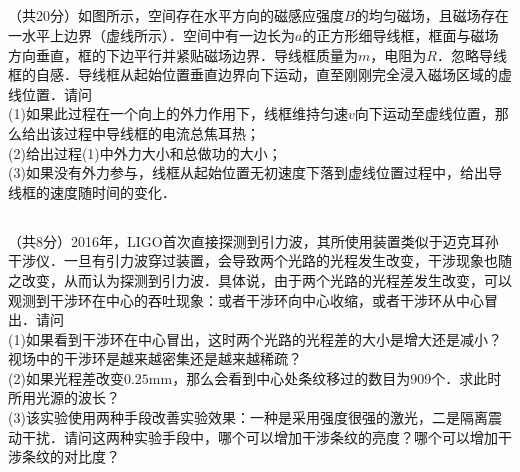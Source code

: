 \subsection{ }
（共20分）如图所示，空间存在水平方向的磁感应强度$B$的均匀磁场，且磁场存在一水平上边界（虚线所示）．空间中有一边长为$a$的正方形细导线框，框面与磁场方向垂直，框的下边平行并紧贴磁场边界．导线框质量为$m$，电阻为$R$．忽略导线框的自感．导线框从起始位置垂直边界向下运动，直至刚刚完全浸入磁场区域的虚线位置．请问\\
(1)如果此过程在一个向上的外力作用下，线框维持匀速$v$向下运动至虚线位置，那么给出该过程中导线框的电流总焦耳热；\\
(2)给出过程(1)中外力大小和总做功的大小；\\
(3)如果没有外力参与，线框从起始位置无初速度下落到虚线位置过程中，给出导线框的速度随时间的变化．

\subsection{ }
（共8分）2016年，LIGO首次直接探测到引力波，其所使用装置类似于迈克耳孙干涉仪．一旦有引力波穿过装置，会导致两个光路的光程发生改变，干涉现象也随之改变，从而认为探测到引力波．具体说，由于两个光路的光程差发生改变，可以观测到干涉环在中心的吞吐现象：或者干涉环向中心收缩，或者干涉环从中心冒出．请问\\
(1)如果看到干涉环在中心冒出，这时两个光路的光程差的大小是增大还是减小？视场中的干涉环是越来越密集还是越来越稀疏？\\
(2)如果光程差改变$0.25\mathrm{mm}$，那么会看到中心处条纹移过的数目为909个．求此时所用光源的波长？\\
(3)该实验使用两种手段改善实验效果：一种是采用强度很强的激光，二是隔离震动干扰．请问这两种实验手段中，哪个可以增加干涉条纹的亮度？哪个可以增加干涉条纹的对比度？